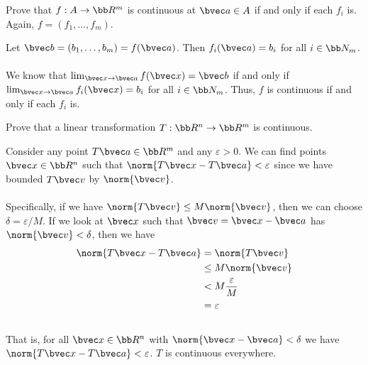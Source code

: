 \documentclass[12pt, letterpaper]{hmcpset}
\begin{document}
\pagebreak

\begin{problem}[24]
	Prove that $f : A \to \bb R^m$ is continuous at $\bvec a \in A$ if and only if each $f_i$ is. Again, $f = (f_1, \ldots, f_m)$.
\end{problem}

\begin{solution}
	Let $\bvec b = (b_1, \ldots, b_m) = f(\bvec a)$. Then $f_i(\bvec a) = b_i$ for all $i \in \bb N_m$.\\\\
	We know that $\lim_{\bvec x \to \bvec a} f(\bvec x) = \bvec b$ if and only if $\lim_{\bvec x \to \bvec a} f_i(\bvec x) = b_i$ for all $i \in \bb N_m$. Thus, $f$ is continuous if and only if each $f_i$ is.
\end{solution}

\pagebreak

\begin{problem}[25]
	Prove that a linear transformation $T : \bb R^n \to \bb R^m$ is continuous.
\end{problem}

\begin{solution}
	Consider any point $T \bvec a \in \bb R^m$ and any $\varepsilon > 0$. We can find points $\bvec x \in \bb R^n$ such that $\norm{T \bvec x - T \bvec a} < \varepsilon$ since we have bounded $T \bvec v$ by $\norm{\bvec v}$. \\\\
	Specifically, if we have $\norm{T \bvec v} \le M \norm{\bvec v}$, then we can choose $\delta = \varepsilon/M$. If we look at $\bvec x$ such that $\bvec v = \bvec x - \bvec a$ has $\norm{\bvec v} < \delta$, then we have
	\[
		\begin{split}
			\norm{T \bvec x - T \bvec a} & = \norm{T \bvec v} \\
						     & \le M \norm{\bvec v} \\
						     & < M \frac{\varepsilon}{M} \\
						     & = \varepsilon
		\end{split}
	\]\\
	That is, for all $\bvec x \in \bb R^n$ with $\norm{\bvec x - \bvec a} < \delta$ we have $\norm{T \bvec x - T \bvec a} < \varepsilon$. $T$ is continuous everywhere.
\end{solution}

\pagebreak
\end{document}
